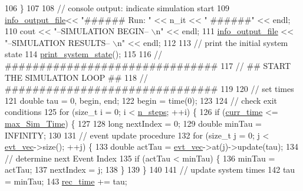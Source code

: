 \begin{DoxyCode}
106         \}
107 
108 \textcolor{comment}{//      console output: indicate simulation start}
109         \hyperlink{classnw_1_1_gillespie___sys_a1137e63fe12d34f81110bf5e8ebe856c}{info\_output\_file}<< \textcolor{stringliteral}{"###### Run: "} << n\_it << \textcolor{stringliteral}{" ######"} << endl;
110         cout << \textcolor{stringliteral}{"--SIMULATION BEGIN-- \(\backslash\)n"} << endl;
111         \hyperlink{classnw_1_1_gillespie___sys_a1137e63fe12d34f81110bf5e8ebe856c}{info\_output\_file} << \textcolor{stringliteral}{"--SIMULATION RESULTS-- \(\backslash\)n"} << endl;
112 
113 \textcolor{comment}{//      print the initial system state}
114         \hyperlink{classnw_1_1_gillespie___sys_afb3cc7c5515ff9646fa3ecc9c4a44e61}{print\_system\_state}();
115 
116 \textcolor{comment}{//      ###############################}
117 \textcolor{comment}{//      ## START THE SIMULATION LOOP ##}
118 \textcolor{comment}{//      ###############################}
119 
120 \textcolor{comment}{//      set times}
121         \textcolor{keywordtype}{double} tau = 0, begin, end;
122         begin = time(0);
123 
124 \textcolor{comment}{//      check exit conditions}
125         \textcolor{keywordflow}{for} (\textcolor{keywordtype}{size\_t} i = 0; i < \hyperlink{classnw_1_1_gillespie___sys_a56184d8a2afdebca9cfe6e08e191fe51}{n\_steps}; ++i) \{
126             \textcolor{keywordflow}{if} (\hyperlink{classnw_1_1_gillespie___sys_ac83bb4eaee1f8b46610a8243a83fb3ad}{curr\_time} <= \hyperlink{classnw_1_1_gillespie___sys_a232687e1809761fea124e81aa7273f3c}{max\_Sim\_Time}) \{
127 
128                 \textcolor{keywordtype}{long} nextIndex = 0;
129                 \textcolor{keywordtype}{double} minTau = INFINITY;
130 
131 \textcolor{comment}{//              event update procedure}
132                 \textcolor{keywordflow}{for} (\textcolor{keywordtype}{size\_t} j = 0; j < \hyperlink{classnw_1_1_gillespie___sys_a3f9b4464bed7135f51413c57f086aef7}{evt\_vec}->size(); ++j) \{
133                     \textcolor{keywordtype}{double} actTau = \hyperlink{classnw_1_1_gillespie___sys_a3f9b4464bed7135f51413c57f086aef7}{evt\_vec}->at(j)->update(tau);
134 \textcolor{comment}{//                  determine next Event Index}
135                     \textcolor{keywordflow}{if} (actTau < minTau) \{
136                         minTau = actTau;
137                         nextIndex = j;
138                     \}
139                 \}
140 
141 \textcolor{comment}{//              update system times}
142                 tau = minTau;
143                 \hyperlink{classnw_1_1_gillespie___sys_a2209a66c1cd88b06fb8a0e8b41d72b29}{rec\_time} += tau;

\end{DoxyCode}
